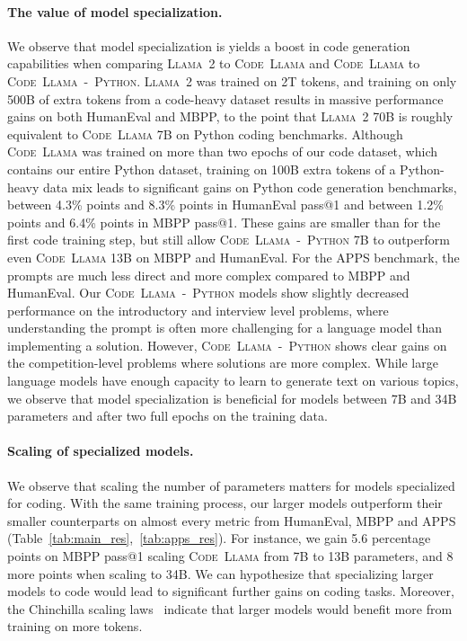 \documentclass[10pt]{article}
\newcommand{\model}{\textsc{Code~Llama}\xspace}
\newcommand{\pymodel}{\textsc{Code~Llama~-~Python}\xspace}
\newcommand{\llamavtwo}{\textsc{Llama~2}\xspace}
\begin{document}
\paragraph{The value of model specialization.} We observe that model specialization is yields a boost in code generation capabilities when comparing \llamavtwo to \model and \model to \pymodel. \llamavtwo was trained on 2T tokens, and training on only 500B of extra tokens from a code-heavy dataset results in massive performance gains on both HumanEval and MBPP, to the point that \llamavtwo 70B is roughly equivalent to \model 7B on Python coding benchmarks. 
Although \model was trained on more than two epochs of our code dataset, which contains our entire Python dataset, training on 100B extra tokens of a Python-heavy data mix leads to significant gains on Python code generation benchmarks, between 4.3\% points and 8.3\% points in HumanEval pass@1 and between 1.2\% points and 6.4\% points in MBPP pass@1. These gains are smaller than for the first code training step, but still allow \pymodel 7B to outperform even \model 13B on MBPP and HumanEval.
For the APPS benchmark, the prompts are much less direct and more complex compared to MBPP and HumanEval. Our \pymodel models show slightly decreased performance on the introductory and interview level problems, where understanding the prompt is often more challenging for a language model than implementing a solution. 
However, \pymodel shows clear gains on the competition-level problems where solutions are more complex.
While large language models have enough capacity to learn to generate text on various topics, we observe that model specialization is beneficial for models between 7B and 34B parameters and after two full epochs on the training data. 

\paragraph{Scaling of specialized models.} We observe that scaling the number of parameters matters for models specialized for coding. With the same training process, our larger models outperform their smaller counterparts on almost every metric from HumanEval, MBPP and APPS (Table~\ref{tab:main_res},~\ref{tab:apps_res}). For instance, we gain 5.6 percentage points on MBPP pass@1 scaling \model from 7B to 13B parameters, and 8 more points when scaling to 34B. We can hypothesize that specializing larger models to code would lead to significant further gains on coding tasks. Moreover, the Chinchilla scaling laws~\citep{hoffmann2022training} indicate that larger models would benefit more from training on more tokens. 
\end{document}
